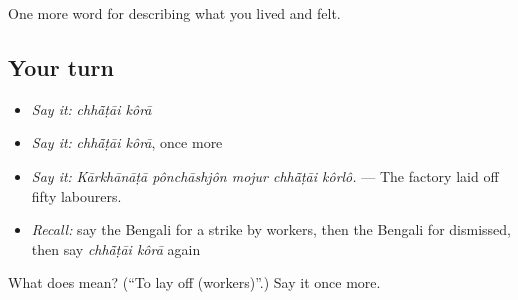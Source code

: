 \begin{grammarlens}[title={What you've built}]
One more word for describing what you lived and felt.
\end{grammarlens}

\subsection*{Your turn}
\begin{itemize}
\raggedright
  \item \emph{Say it:} \emph{chhā̃ṭāi kôrā}
  \item \emph{Say it:} \emph{chhā̃ṭāi kôrā}, once more
  \item \emph{Say it:} \emph{Kārkhānāṭā pônchāshjôn mojur chhā̃ṭāi kôrlô.} — The factory laid off fifty labourers.
  \item \emph{Recall:} say the Bengali for a strike by workers, then the Bengali for dismissed, then say \emph{chhā̃ṭāi kôrā} again
\end{itemize}

\begin{tcolorbox}[breakable,colback=teal!4,colframe=teal!35!black,title={Before you move on}]
What does   mean? (\textquotedblleft{}To lay off (workers)\textquotedblright{}.) Say it once more.
\end{tcolorbox}
